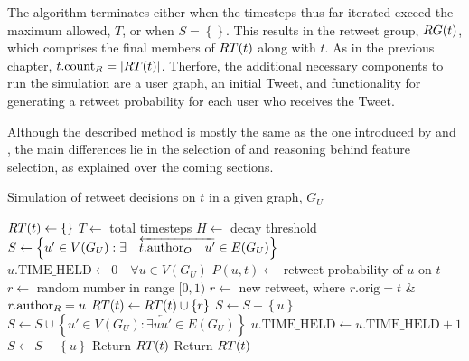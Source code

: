 The algorithm terminates either when the timesteps thus far iterated exceed the maximum allowed, $T$, or when $S = \left\{\right\}$. This results in the retweet group, $RG(t)$, which comprises the final members of $RT(t)$ along with $t$. As in the previous chapter, $t.\textrm{count}_R = |RT(t)|$. Therfore, the additional necessary components to run the simulation are a user graph, an initial Tweet, and functionality for generating a retweet probability for each user who receives the Tweet.

Although the described method is mostly the same as the one introduced by \citet{zhu11} and \citet{peng11}, the main differences lie in the selection of and reasoning behind feature selection, as explained over the coming sections.

\begin{algorithm}
\caption{Simulation of retweet decisions on $t$ in a given graph, $G_U$}
\begin{algorithmic}[1]
    \State $RT(t)\gets \left\{\right\}$
    \State $T\gets$ total timesteps
    \State $H\gets$ decay threshold 
    \State $S\gets \left\{u' \in V(G_U) : \exists \quad \overleftarrow{t.\textrm{author}_O \quad u'} \in E(G_U)\right\}$
    \State $u.\textrm{TIME\_HELD}\gets 0 \quad \forall u \in V(G_U)$
    \Statex %
            \State $P(u,t)\gets$ retweet probability of $u$ on $t$
            \State $r\gets$ random number in range $[0,1)$
                \State $r\gets$ new retweet, where $r.\textrm{orig} = t$ \& $r.\textrm{author}_R = u$
                \State $RT(t)\gets RT(t) \cup \left\{r\right\}$
                \State $S\gets S - \left\{u\right\}$
                \State $S\gets S \cup \left\{u' \in V(G_U) : \exists \overleftarrow{u u'} \in E(G_U)\right\}$
            \Else
                \State $u.\textrm{TIME\_HELD}\gets u.\textrm{TIME\_HELD} + 1$
                    \State $S\gets S - \left\{u\right\}$ 
                \EndIf
            \EndIf
        \EndFor
            \State Return $RT(t)$ 
        \EndIf
    \EndFor
    \State Return $RT(t)$
\EndProcedure
\end{algorithmic}
\label{algo1}
\end{algorithm}


